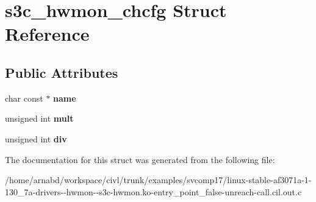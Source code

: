 \hypertarget{structs3c__hwmon__chcfg}{}\section{s3c\+\_\+hwmon\+\_\+chcfg Struct Reference}
\label{structs3c__hwmon__chcfg}
\subsection*{Public Attributes}
\begin{DoxyCompactItemize}
\item 
\hypertarget{structs3c__hwmon__chcfg_a4b4c52a8c33f224c2d23d529e7fa5c41}{}char const $\ast$ {\bfseries name}\label{structs3c__hwmon__chcfg_a4b4c52a8c33f224c2d23d529e7fa5c41}

\item 
\hypertarget{structs3c__hwmon__chcfg_af62e8f55d12c7acbe55977928109aaaa}{}unsigned int {\bfseries mult}\label{structs3c__hwmon__chcfg_af62e8f55d12c7acbe55977928109aaaa}

\item 
\hypertarget{structs3c__hwmon__chcfg_af21704373958d7138743553d80f2861b}{}unsigned int {\bfseries div}\label{structs3c__hwmon__chcfg_af21704373958d7138743553d80f2861b}

\end{DoxyCompactItemize}


The documentation for this struct was generated from the following file\+:\begin{DoxyCompactItemize}
\item 
/home/arnabd/workspace/civl/trunk/examples/svcomp17/linux-\/stable-\/af3071a-\/1-\/130\+\_\+7a-\/drivers-\/-\/hwmon-\/-\/s3c-\/hwmon.\+ko-\/entry\+\_\+point\+\_\+false-\/unreach-\/call.\+cil.\+out.\+c\end{DoxyCompactItemize}
